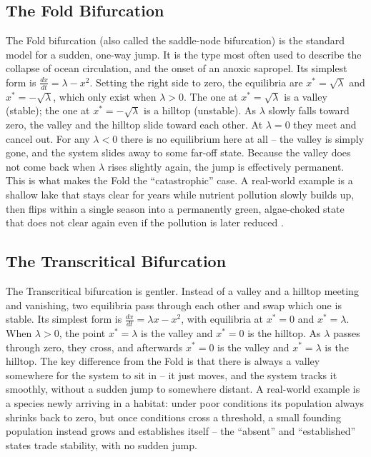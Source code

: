 \subsection{The Fold Bifurcation}
The Fold bifurcation (also called the saddle-node bifurcation) is the standard model for a sudden, one-way jump. It is the type most often used to describe the collapse of ocean circulation, and the onset of an anoxic sapropel. Its simplest form is $\frac{dx}{dt} = \lambda - x^2$. Setting the right side to zero, the equilibria are $x^* = \sqrt{\lambda}$ and $x^* = -\sqrt{\lambda}$, which only exist when $\lambda > 0$. The one at $x^* = \sqrt{\lambda}$ is a valley (stable); the one at $x^* = -\sqrt{\lambda}$ is a hilltop (unstable). As $\lambda$ slowly falls toward zero, the valley and the hilltop slide toward each other. At $\lambda = 0$ they meet and cancel out. For any $\lambda < 0$ there is no equilibrium here at all -- the valley is simply gone, and the system slides away to some far-off state. Because the valley does not come back when $\lambda$ rises slightly again, the jump is effectively permanent. This is what makes the Fold the ``catastrophic'' case. A real-world example is a shallow lake that stays clear for years while nutrient pollution slowly builds up, then flips within a single season into a permanently green, algae-choked state that does not clear again even if the pollution is later reduced \citep{scheffer2009}.

\subsection{The Transcritical Bifurcation}
The Transcritical bifurcation is gentler. Instead of a valley and a hilltop meeting and vanishing, two equilibria pass through each other and swap which one is stable. Its simplest form is $\frac{dx}{dt} = \lambda x - x^2$, with equilibria at $x^* = 0$ and $x^* = \lambda$. When $\lambda > 0$, the point $x^* = \lambda$ is the valley and $x^* = 0$ is the hilltop. As $\lambda$ passes through zero, they cross, and afterwards $x^* = 0$ is the valley and $x^* = \lambda$ is the hilltop. The key difference from the Fold is that there is always a valley somewhere for the system to sit in -- it just moves, and the system tracks it smoothly, without a sudden jump to somewhere distant. A real-world example is a species newly arriving in a habitat: under poor conditions its population always shrinks back to zero, but once conditions cross a threshold, a small founding population instead grows and establishes itself -- the ``absent'' and ``established'' states trade stability, with no sudden jump.

